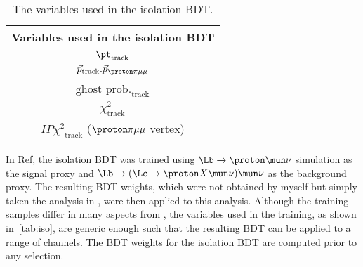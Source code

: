 \begin{table}[h!]
  
  \centering
  \begin{tabular}{c}

    \hline
    Variables used in the isolation BDT\\
    \hline
    $\pt_{\mathrm{track}}$\\
    $\vec{p}_{\mathrm{track}}.\vec{p}_{\proton\pi\mu\mu}$\\ %
    $\mathrm{ghost}$ $\mathrm{prob.}_{\mathrm{track}}$\\
    $\chi^{2}_{\mathrm{track}}$ \\
    $IP{\chi^{2}}_{\mathrm{track}}$ ($\proton\pi\mu\mu$ vertex)\\
    \hline
  \end{tabular}
  \caption{The variables used in the isolation BDT.}
  \label{tab:iso}
\end{table}

In Ref\cite{LHCB-ANA-2014-048}, the isolation BDT was trained using $\Lb\to\proton\mun\nu$ simulation as the signal proxy and $\Lb\to(\Lc\to \proton X\mun\nu)\mun\nu$ as the background proxy. The resulting BDT weights, which were not obtained by myself but simply taken the analysis in \cite{LHCB-ANA-2014-048}, were then applied to this analysis. Although the training samples differ in many aspects from \Lbpi, the variables used in the training, as shown in~\autoref{tab:iso}, are generic enough such that the resulting BDT can be applied to a range of channels. The BDT weights for the isolation BDT are computed prior to any selection.%

